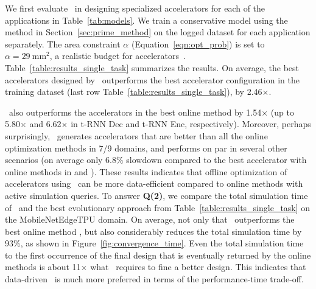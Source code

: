 %
We first evaluate \primemethodname\ in designing specialized accelerators for each of the applications in Table~\ref{tab:models}.
%
We train a conservative model using the method in Section~\ref{sec:prime_method} on the logged dataset for each application separately.
%
The area constraint $\alpha$ (Equation~\ref{eqn:opt_prob}) is set to $\alpha = 29~\text{mm}^2$, a realistic budget for accelerators~\citep{yazdanbakhsh2021apollo}. Table~\ref{table:results_single_task} summarizes the results.
%
On average, the best accelerators designed by \primemethodname\ outperforms the best accelerator configuration in the training dataset (last row Table~\ref{table:results_single_task}), by 2.46$\times$.
%
 
%
\primemethodname\ also outperforms the accelerators in the best online method by 1.54$\times$ (up to 5.80$\times$ and 6.62$\times$ in t-RNN Dec and t-RNN Enc, respectively).
%
Moreover, perhaps surprisingly, \primemethodname\ generates accelerators that are better than all the online optimization methods in 7/9 domains, and performs on par in several other scenarios (on average only 6.8$\%$ slowdown compared to the best accelerator with online methods in \mfive and \msix). 
%
These results indicates that offline optimization of accelerators using \primemethodname\ can be more data-efficient compared to online methods with active simulation queries.
%
To answer \textbf{Q(2)}, we compare the total simulation time of \primemethodname\ and the best evolutionary approach from Table~\ref{table:results_single_task} on the MobileNetEdgeTPU domain.
%
On average, not only that \primemethodname\ outperforms the best online method , but also considerably reduces the total simulation time by 93\%, as shown in Figure~\ref{fig:convergence_time}.
% 
Even the total simulation time to the first occurrence of the final design that is eventually returned by the online methods is about 11$\times$ what \primemethodname\ requires to fine a better design.
%
This indicates that data-driven \primemethodname\ is much more preferred in terms of the performance-time trade-off.  


